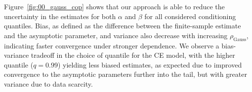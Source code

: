 \documentclass[
  12pt]{article}
\newcommand{\rhou}[1]{\rho_{\text{#1}}}
\begin{document}

Figure~\ref{fig:00_gauss_cop} shows that our approach is able to reduce the uncertainty in the estimates for both $\alpha$ and $\beta$ for all considered conditioning quantiles. 
Bias, as defined as the difference between the finite-sample estimate and the asymptotic parameter, and variance also decrease with increasing $\rho_{\text{Gauss}}$, indicating faster convergence under stronger dependence. 
We observe a bias-variance tradeoff in the choice of quantile for the CE model, with the higher quantile ($q=0.99$) yielding less biased estimates, as expected due to improved convergence to the asymptotic parameters further into the tail, but with greater variance due to data scarcity.
\end{document}
